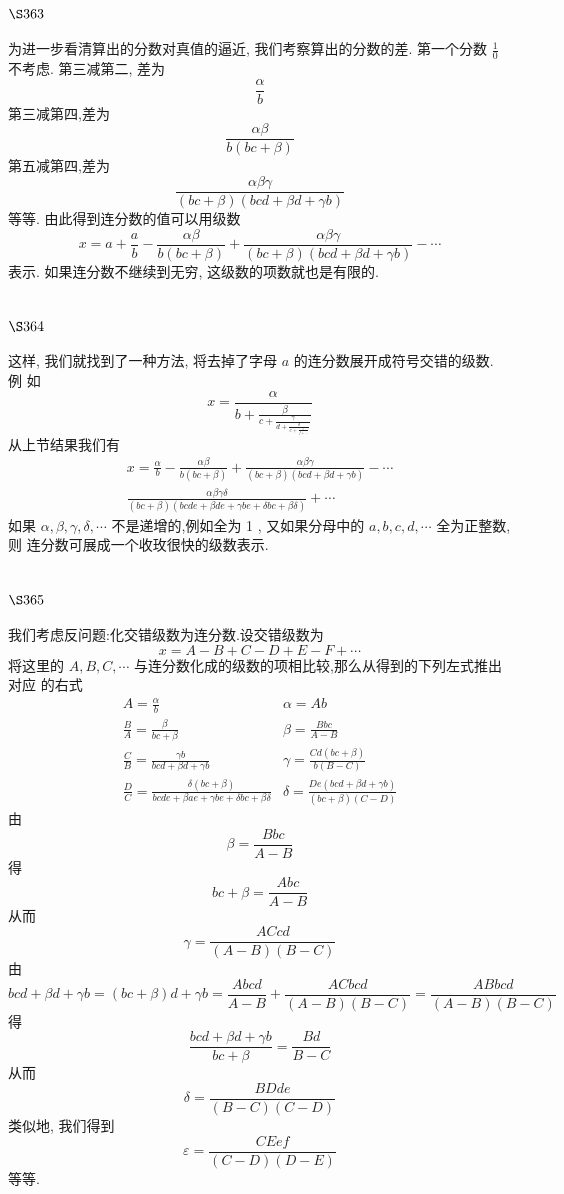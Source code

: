 \section{$\S 363$}

为进一步看清算出的分数对真值的逼近, 我们考察算出的分数的差. 第一个分数 $\frac{1}{0}$ 不考虑. 第三减第二, 差为
\[
\frac{\alpha}{b}
\]
第三减第四,差为
\[
\frac{\alpha \beta}{b(b c+\beta)}
\]
第五减第四,差为
\[
\frac{\alpha \beta \gamma}{(b c+\beta)(b c d+\beta d+\gamma b)}
\]
等等. 由此得到连分数的值可以用级数
\[
x=a+\frac{a}{b}-\frac{\alpha \beta}{b(b c+\beta)}+\frac{\alpha \beta \gamma}{(b c+\beta)(b c d+\beta d+\gamma b)}-\cdots
\]
表示. 如果连分数不继续到无穷, 这级数的项数就也是有限的.

\section{$\S 364$}

这样, 我们就找到了一种方法, 将去掉了字母 $a$ 的连分数展开成符号交错的级数. 例 如
\[
x=\frac{\alpha}{b+\frac{\beta}{c+\frac{\gamma}{d+\frac{\delta}{e+\frac{\varepsilon}{f+\cdots}}}}}
\]
从上节结果我们有
\[
\begin{gathered}
x=\frac{\alpha}{b}-\frac{\alpha \beta}{b(b c+\beta)}+\frac{\alpha \beta \gamma}{(b c+\beta)(b c d+\beta d+\gamma b)}-\cdots \\
\frac{\alpha \beta \gamma \delta}{(b c+\beta)(b c d e+\beta d e+\gamma b e+\delta b c+\beta \delta)}+\cdots
\end{gathered}
\]
如果 $\alpha, \beta, \gamma, \delta, \cdots$ 不是递增的,例如全为 1 , 又如果分母中的 $a, b, c, d, \cdots$ 全为正整数, 则 连分数可展成一个收玫很快的级数表示. 

\section{$\S 365$}

我们考虑反问题:化交错级数为连分数.设交错级数为
\[
x=A-B+C-D+E-F+\cdots
\]
将这里的 $A, B, C, \cdots$ 与连分数化成的级数的项相比较,那么从得到的下列左式推出对应 的右式
\[
\begin{array}{ll}
A=\frac{\alpha}{b} & \alpha=A b \\
\frac{B}{A}=\frac{\beta}{b c+\beta} & \beta=\frac{B b c}{A-B} \\
\frac{C}{B}=\frac{\gamma b}{b c d+\beta d+\gamma b} & \gamma=\frac{C d(b c+\beta)}{b(B-C)} \\
\frac{D}{C}=\frac{\delta(b c+\beta)}{b c d e+\beta a e+\gamma b e+\delta b c+\beta \delta} & \delta=\frac{D e(b c d+\beta d+\gamma b)}{(b c+\beta)(C-D)}
\end{array}
\]
由
\[
\beta=\frac{B b c}{A-B}
\]
得
\[
b c+\beta=\frac{A b c}{A-B}
\]
从而
\[
\gamma=\frac{A C c d}{(A-B)(B-C)}
\]
由
\[
b c d+\beta d+\gamma b=(b c+\beta) d+\gamma b=\frac{A b c d}{A-B}+\frac{A C b c d}{(A-B)(B-C)}=\frac{A B b c d}{(A-B)(B-C)}
\]
得
\[
\frac{b c d+\beta d+\gamma b}{b c+\beta}=\frac{B d}{B-C}
\]
从而
\[
\delta=\frac{B D d e}{(B-C)(C-D)}
\]
类似地, 我们得到
\[
\varepsilon=\frac{C E e f}{(C-D)(D-E)}
\]
等等.


